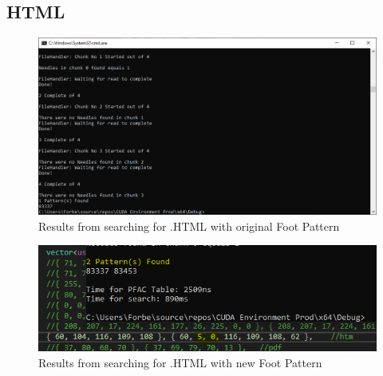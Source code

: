 \subsection*{HTML}
\label{subsec:fileTypeHTML}
\begin{figure}[!ht]
    \centering
    \includegraphics[width=\linewidth]{Images/Tests/64MB/HTMLResultORGFOOT.png}
    \caption{Results from searching for .HTML with original Foot Pattern}
    \label{appItem:HTMLsearchOLD}
\end{figure}
\begin{figure}[!ht]
    \centering
    \includegraphics[width=\linewidth]{Images/Tests/64MB/HTMLResultnewFOOT.png}
    \caption{Results from searching for .HTML with new Foot Pattern}
    \label{appItem:HTMLsearchNEW}
\end{figure}
